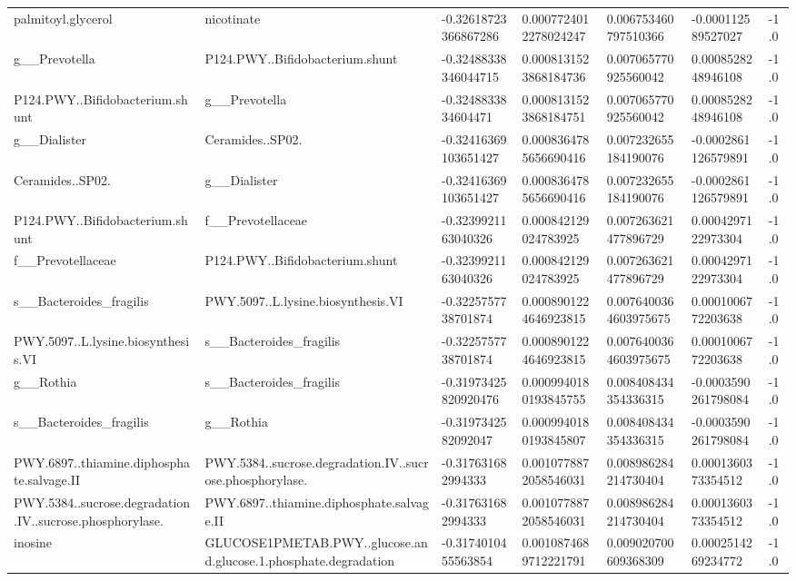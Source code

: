 \begin{longtable}{lllllll}
palmitoyl.glycerol & nicotinate & -0.32618723366867286 & 0.0007724012278024247 & 0.006753460797510366 & -0.000112589527027 & -1.0 \\
g\_\_Prevotella & P124.PWY..Bifidobacterium.shunt & -0.32488338346044715 & 0.0008131523868184736 & 0.007065770925560042 & 0.0008528248946108 & -1.0 \\
P124.PWY..Bifidobacterium.shunt & g\_\_Prevotella & -0.3248833834604471 & 0.0008131523868184751 & 0.007065770925560042 & 0.0008528248946108 & -1.0 \\
g\_\_Dialister & Ceramides..SP02. & -0.32416369103651427 & 0.0008364785656690416 & 0.007232655184190076 & -0.0002861126579891 & -1.0 \\
Ceramides..SP02. & g\_\_Dialister & -0.32416369103651427 & 0.0008364785656690416 & 0.007232655184190076 & -0.0002861126579891 & -1.0 \\
P124.PWY..Bifidobacterium.shunt & f\_\_Prevotellaceae & -0.3239921163040326 & 0.000842129024783925 & 0.007263621477896729 & 0.0004297122973304 & -1.0 \\
f\_\_Prevotellaceae & P124.PWY..Bifidobacterium.shunt & -0.3239921163040326 & 0.000842129024783925 & 0.007263621477896729 & 0.0004297122973304 & -1.0 \\
s\_\_Bacteroides\_fragilis & PWY.5097..L.lysine.biosynthesis.VI & -0.3225757738701874 & 0.0008901224646923815 & 0.0076400364603975675 & 0.0001006772203638 & -1.0 \\
PWY.5097..L.lysine.biosynthesis.VI & s\_\_Bacteroides\_fragilis & -0.3225757738701874 & 0.0008901224646923815 & 0.0076400364603975675 & 0.0001006772203638 & -1.0 \\
g\_\_Rothia & s\_\_Bacteroides\_fragilis & -0.31973425820920476 & 0.0009940180193845755 & 0.008408434354336315 & -0.0003590261798084 & -1.0 \\
s\_\_Bacteroides\_fragilis & g\_\_Rothia & -0.3197342582092047 & 0.0009940180193845807 & 0.008408434354336315 & -0.0003590261798084 & -1.0 \\
PWY.6897..thiamine.diphosphate.salvage.II & PWY.5384..sucrose.degradation.IV..sucrose.phosphorylase. & -0.317631682994333 & 0.0010778872058546031 & 0.008986284214730404 & 0.0001360373354512 & -1.0 \\
PWY.5384..sucrose.degradation.IV..sucrose.phosphorylase. & PWY.6897..thiamine.diphosphate.salvage.II & -0.317631682994333 & 0.0010778872058546031 & 0.008986284214730404 & 0.0001360373354512 & -1.0 \\
inosine & GLUCOSE1PMETAB.PWY..glucose.and.glucose.1.phosphate.degradation & -0.3174010455563854 & 0.0010874689712221791 & 0.009020700609368309 & 0.0002514269234772 & -1.0 \\

\end{longtable}
